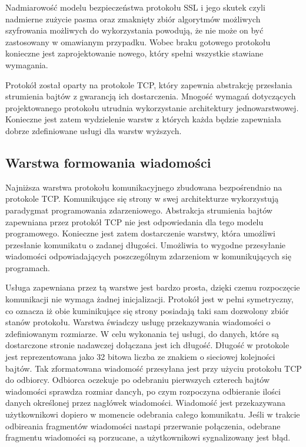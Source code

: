 Nadmiarowość modelu bezpieczeństwa protokołu SSL i jego skutek czyli
nadmierne zużycie pasma oraz zmaknięty zbiór algorytmów możliwych
szyfrowania możliwych do wykorzystania powodują, że nie może on być
zastosowany w omawianym przypadku. Wobec braku gotowego protokołu
konieczne jest zaprojektowanie nowego, który spełni wszystkie stawiane
wymagania.

Protokół został oparty na protokole TCP, który zapewnia abstrakcję
przesłania strumienia bajtów z gwarancją ich dostarczenia. Mnogość
wymagań dotyczących projektowanego protokołu utrudnia wykorzystanie
architektury jednowarstwowej. Konieczne jest zatem wydzielenie warstw
z których każda będzie zapewniała dobrze zdefiniowane usługi dla
warstw wyższych.
 

\subsection[Warstwa formowania wiadomości][Warstwa formowania wiadomości]{Warstwa formowania wiadomości}

Najniższa warstwa protokołu komunikacyjnego zbudowana bezpośrendnio na
protokole TCP. Komunikujące się strony w swej architekturze
wykorzystują paradygmat programowania zdarzeniowego. Abstrakcja
strumienia bajtów zapewniana przez protokół TCP nie jest odpowiedania
dla tego modelu programowego. Konieczne jest zatem dostarczenie
warstwy, która umożliwi przesłanie komunikatu o zadanej
długości. Umożliwia to wygodne przesyłanie wiadomości odpowiadających
poszczególnym zdarzeniom w komunikujących się programach.

Usługa zapewniana przez tą warstwe jest bardzo prosta, dzięki czemu
rozpoczęcie komunikacji nie wymaga żadnej inicjalizacji. Protokół jest
w pełni symetryczny, co oznacza iż obie kuminikujące się strony
posiadają taki sam dozwolony zbiór stanów protokołu. Warstwa świadczy
usługę przekazywania wiadomości o zdefiniowanym rozmiarze. W celu
wykonania tej usługi, do danych, które są dostarczone stronie
nadawczej dołączana jest ich długość. Długość w protokole jest
reprezentowana jako 32 bitowa liczba ze znakiem o sieciowej kolejności
bajtów. Tak zformatowana wiadomość przesyłana jest przy użyciu
protokołu TCP do odbiorcy. Odbiorca oczekuje po odebraniu pierwszych
czterech bajtów wiadomości sprawdza rozmiar dancyh, po czym rozpoczyna
odbieranie ilości danych określonej przez nagłówek
wiadomości. Wiadomość jest przekazywana użytkownikowi dopiero w
momencie odebrania całego komunikatu. Jeśli w trakcie odbireania
fragmentów wiadomości nastapi przerwanie połączenia, odebrane
fragmentu wiadomości są porzucane, a użytkownikowi sygnalizowany jest
błąd.


